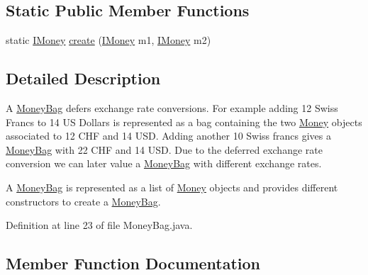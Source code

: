 \subsection*{Static Public Member Functions}
\begin{DoxyCompactItemize}
\item 
static \hyperlink{interfacees_1_1deusto_1_1testing_1_1junit_1_1_i_money}{I\+Money} \hyperlink{classes_1_1deusto_1_1testing_1_1junit_1_1_money_bag_a8d2d54a342d2de2b75530600123efc9a}{create} (\hyperlink{interfacees_1_1deusto_1_1testing_1_1junit_1_1_i_money}{I\+Money} m1, \hyperlink{interfacees_1_1deusto_1_1testing_1_1junit_1_1_i_money}{I\+Money} m2)
\end{DoxyCompactItemize}


\subsection{Detailed Description}
A \hyperlink{classes_1_1deusto_1_1testing_1_1junit_1_1_money_bag}{Money\+Bag} defers exchange rate conversions. For example adding 12 Swiss Francs to 14 US Dollars is represented as a bag containing the two \hyperlink{classes_1_1deusto_1_1testing_1_1junit_1_1_money}{Money} objects associated to 12 C\+HF and 14 U\+SD. Adding another 10 Swiss francs gives a \hyperlink{classes_1_1deusto_1_1testing_1_1junit_1_1_money_bag}{Money\+Bag} with 22 C\+HF and 14 U\+SD. Due to the deferred exchange rate conversion we can later value a \hyperlink{classes_1_1deusto_1_1testing_1_1junit_1_1_money_bag}{Money\+Bag} with different exchange rates.

A \hyperlink{classes_1_1deusto_1_1testing_1_1junit_1_1_money_bag}{Money\+Bag} is represented as a list of \hyperlink{classes_1_1deusto_1_1testing_1_1junit_1_1_money}{Money} objects and provides different constructors to create a \hyperlink{classes_1_1deusto_1_1testing_1_1junit_1_1_money_bag}{Money\+Bag}. 

Definition at line 23 of file Money\+Bag.\+java.



\subsection{Member Function Documentation}
\mbox{\label{classes_1_1deusto_1_1testing_1_1junit_1_1_money_bag_ab3be83ff12fa6d19b67b669194120d00}} 
